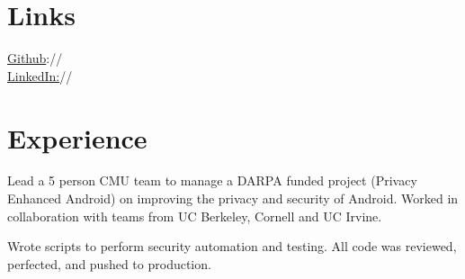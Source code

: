 \documentclass[]{deedy-resume-openfont}
\begin{document}
\begin{minipage}[t]{0.33\textwidth}
\section{Links} 
\href{https://github.com/saksham12}{Github}://\href{https://github.com/saksham12}{}\\
\href{https://www.linkedin.com/in/saksham-chitkara-b319698a/} {LinkedIn:}//  
\href{https://www.linkedin.com/in/saksham-chitkara-b319698a/}{}\\
\sectionsep

%
%

\end{minipage} 
\hfill
\begin{minipage}[t]{0.66\textwidth} 


\section{Experience}

\vspace{\topsep} %
\begin{tightemize}
\item Lead a 5 person CMU team to manage a DARPA funded project (Privacy Enhanced Android) on improving the privacy and security of Android. Worked in collaboration with teams from UC Berkeley, Cornell and UC Irvine.
\end{tightemize}
\sectionsep

\begin{tightemize}
\item Wrote scripts to perform security automation and testing. All code was reviewed, perfected, and pushed to production.
\end{tightemize}
\sectionsep



\end{minipage}
\end{document}
